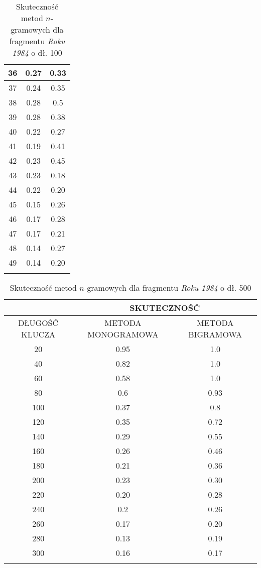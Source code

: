 \documentclass[a4paper]{article}
\theoremstyle{defn}
\theoremstyle{theorem}
\theoremstyle{lemma}
\theoremstyle{cor}
\theoremstyle{fact}
\begin{document}
\begin{center}
\begin{longtable}{
|c|c|c|}
36
 & 0.27 & 0.33\\ \hline
37
 & 0.24 & 0.35\\ \hline
38
 & 0.28 & 0.5\\ \hline
39
 & 0.28 & 0.38\\ \hline
40
 & 0.22 & 0.27\\ \hline
41
 & 0.19 & 0.41\\ \hline
42
 & 0.23 & 0.45\\ \hline
43
 & 0.23 & 0.18\\ \hline
44
 & 0.22 & 0.20\\ \hline
45
 & 0.15 & 0.26\\ \hline
46
 & 0.17 & 0.28\\ \hline
47
 & 0.17 & 0.21\\ \hline
48
 & 0.14 & 0.27\\ \hline
49
 & 0.14 & 0.20\\ \hline
 \caption{Skuteczność metod $n$-gramowych dla fragmentu \textit{Roku 1984} o dł. 100}
\end{longtable}\end{center}

\begin{center}\begin{longtable}{
|c|c|c|}
\hline &\multicolumn{2}{|c|}{SKUTECZNOŚĆ} \\
\hline DŁUGOŚĆ KLUCZA & METODA MONOGRAMOWA & METODA BIGRAMOWA\\ \hline
20
 & 0.95 & 1.0\\ \hline
40
 & 0.82 & 1.0\\ \hline
60
 & 0.58 & 1.0\\ \hline
80
 & 0.6 & 0.93\\ \hline
100
 & 0.37 & 0.8\\ \hline
120
 & 0.35 & 0.72\\ \hline
140
 & 0.29 & 0.55\\ \hline
160
 & 0.26 & 0.46\\ \hline
180
 & 0.21 & 0.36\\ \hline
200
 & 0.23 & 0.30\\ \hline
220
 & 0.20 & 0.28\\ \hline
240
 & 0.2 & 0.26\\ \hline
260
 & 0.17 & 0.20\\ \hline
280
 & 0.13 & 0.19\\ \hline
300
 & 0.16 & 0.17\\ \hline
  \caption{Skuteczność metod $n$-gramowych dla fragmentu \textit{Roku 1984} o dł. 500}
\end{longtable}\end{center}
\end{document}
